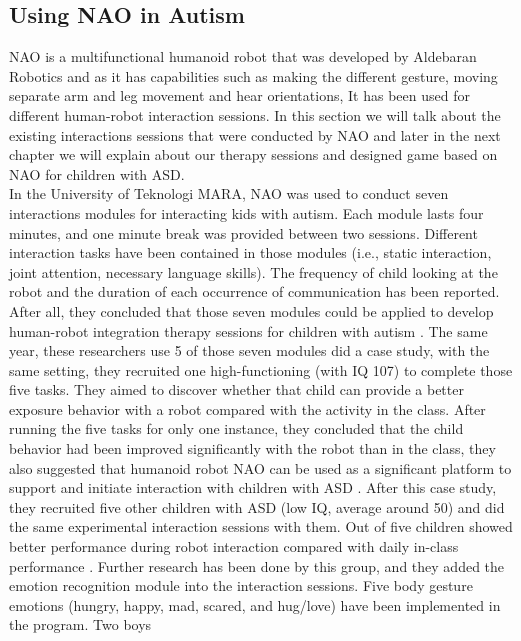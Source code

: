 \subsection{Using NAO in Autism}
NAO is a multifunctional humanoid robot that was developed by Aldebaran Robotics and as it has 
capabilities such as making the different gesture, moving separate arm and leg movement and hear 
orientations, It has been used for different human-robot interaction sessions. In this section 
we will talk about the existing interactions sessions that were conducted by NAO and later in the 
next chapter we will explain about our therapy sessions and designed game based on NAO for children 
with ASD.\\

In the University of Teknologi MARA, NAO was used to conduct seven interactions modules for interacting 
kids with autism. Each module lasts four minutes, and one minute break was provided between two sessions. 
Different interaction tasks have been contained in those modules (i.e., static interaction, joint 
attention, necessary language skills). The frequency of child looking at the robot and the duration of each occurrence 
of communication has been reported. After all, they concluded that those seven modules could be applied to 
develop human-robot integration therapy sessions for children with autism \cite{shamsuddin2012initial1}. The same year, these 
researchers use 5 of those seven modules did a case study, with the same setting, they recruited one 
high-functioning (with IQ 107) to complete those five tasks. They aimed to discover whether that child 
can provide a better exposure behavior with a robot compared with the activity in the class. After 
running the five tasks for only one instance, they concluded that the child behavior had been 
improved significantly with the robot than in the class, they also suggested that humanoid robot NAO 
can be used as a significant platform to support and initiate interaction with children with ASD \cite{shamsuddin2012initial2}. 
After this case study, they recruited five other children with ASD (low IQ, average around 50) and did 
the same experimental interaction sessions with them. Out of five children showed better performance 
during robot interaction compared with daily in-class performance \cite{shamsuddin2012humanoid}. Further research has been done 
by this group, and they added the emotion recognition module into the interaction sessions. Five body gesture 
emotions (hungry, happy, mad, scared, and hug/love) have been implemented in the program. Two boys 
